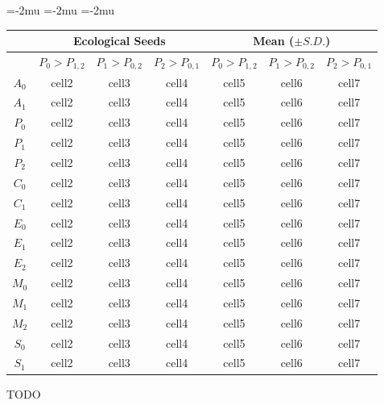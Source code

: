 \begin{figure}[t]

\begin{center}
\setlength\tabcolsep{1.5pt} %
\medmuskip=-2mu
\thinmuskip=-2mu
\thickmuskip=-2mu
\nulldelimiterspace=-1pt
\scriptspace=0pt
\begin{tabular}{ | c | c c c | c c c | }
  \hline
  & \multicolumn{3}{|c|}{Ecological Seeds} & \multicolumn{3}{|c|}{Mean ($\pm S.D.$)} \\
 \hline
  & \tiny{$P_0 > P_{1,2}$} & \tiny{$P_1 > P_{0,2}$} & \tiny{$P_2 > P_{0,1}$} & \tiny{$P_0 > P_{1,2}$} & \tiny{$P_1 > P_{0,2}$} & \tiny{$P_2 > P_{0,1}$}  \\
 \hline
 $A_0$ & cell2 & cell3 & cell4 & cell5 & cell6 & cell7 \\
 $A_1$ & cell2 & cell3 & cell4 & cell5 & cell6 & cell7 \\
 $P_0$ & cell2 & cell3 & cell4 & cell5 & cell6 & cell7 \\
 $P_1$ & cell2 & cell3 & cell4 & cell5 & cell6 & cell7 \\
 $P_2$ & cell2 & cell3 & cell4 & cell5 & cell6 & cell7 \\
 $C_0$ & cell2 & cell3 & cell4 & cell5 & cell6 & cell7 \\
 $C_1$ & cell2 & cell3 & cell4 & cell5 & cell6 & cell7 \\
 $E_0$ & cell2 & cell3 & cell4 & cell5 & cell6 & cell7 \\
 $E_1$ & cell2 & cell3 & cell4 & cell5 & cell6 & cell7 \\
 $E_2$ & cell2 & cell3 & cell4 & cell5 & cell6 & cell7 \\
 $M_0$ & cell2 & cell3 & cell4 & cell5 & cell6 & cell7 \\
 $M_1$ & cell2 & cell3 & cell4 & cell5 & cell6 & cell7 \\
 $M_2$ & cell2 & cell3 & cell4 & cell5 & cell6 & cell7 \\
 $S_0$ & cell2 & cell3 & cell4 & cell5 & cell6 & cell7 \\
 $S_1$ & cell2 & cell3 & cell4 & cell5 & cell6 & cell7 \\
 \hline
\end{tabular}
\end{center}
\caption{
TODO
}
\label{fig:genotypes}
\end{figure}
